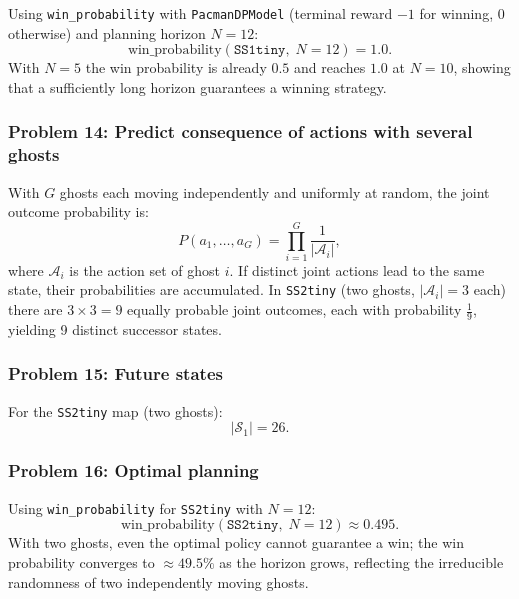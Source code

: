 \documentclass[12pt]{article}
\begin{document}
Using \texttt{win\_probability} with \texttt{PacmanDPModel} (terminal reward $-1$ for winning, 0 otherwise) and planning horizon $N=12$:
$$\text{win\_probability}(\texttt{SS1tiny},\; N=12) = 1.0.$$
With $N=5$ the win probability is already $0.5$ and reaches $1.0$ at $N=10$, showing that a sufficiently long horizon guarantees a winning strategy.

\subsubsection*{{\color{red}Problem 14:  Predict consequence of actions with several ghosts}}

With $G$ ghosts each moving independently and uniformly at random, the joint outcome probability is:
$$P(a_1,\ldots,a_G) = \prod_{i=1}^{G} \frac{1}{|\mathcal{A}_i|},$$
where $\mathcal{A}_i$ is the action set of ghost $i$. If distinct joint actions lead to the same state, their probabilities are accumulated. In \texttt{SS2tiny} (two ghosts, $|\mathcal{A}_i|=3$ each) there are $3\times3=9$ equally probable joint outcomes, each with probability $\tfrac{1}{9}$, yielding 9 distinct successor states.

\subsubsection*{{\color{red}Problem 15:  Future states}}

For the \texttt{SS2tiny} map (two ghosts):
$$|\mathcal{S}_1| = 26.$$

\subsubsection*{{\color{red}Problem 16:  Optimal planning}}

Using \texttt{win\_probability} for \texttt{SS2tiny} with $N=12$:
$$\text{win\_probability}(\texttt{SS2tiny},\; N=12) \approx 0.495.$$
With two ghosts, even the optimal policy cannot guarantee a win; the win probability converges to $\approx 49.5\%$ as the horizon grows, reflecting the irreducible randomness of two independently moving ghosts.
\end{document}
